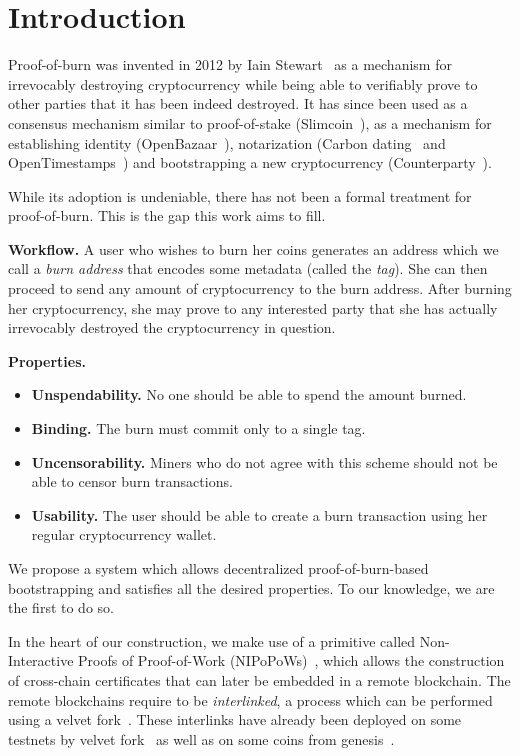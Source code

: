\section{Introduction}\label{section:introduction}
Proof-of-burn was invented in 2012 by Iain Stewart~\cite{stewart} as a mechanism for irrevocably destroying cryptocurrency while being able to verifiably prove to other parties that it has been indeed destroyed. It has since been used as a consensus mechanism similar to proof-of-stake (Slimcoin~\cite{slimcoin}), as a mechanism for establishing identity (OpenBazaar~\cite{zindros2016trust}), notarization (Carbon dating~\cite{clark2012commitcoin} and OpenTimestamps~\cite{todd2016opentimestamps}) and bootstrapping a new cryptocurrency (Counterparty~\cite{counterparty}).

While its adoption is undeniable, there has not been a formal treatment for proof-of-burn. This is the gap this work aims to fill.

\noindent
\textbf{Workflow.}
A user who wishes to burn her coins generates an address which we call a \emph{burn address} that encodes some metadata (called the \emph{tag}). She can then proceed to send any amount of cryptocurrency to the burn address. After burning her cryptocurrency, she may prove to any interested party that she has actually irrevocably destroyed the cryptocurrency in question.

\noindent
\textbf{Properties.}
\begin{itemize}
    \item \textbf{Unspendability.} No one should be able to spend the amount burned.
    \item \textbf{Binding.} The burn must commit only to a single tag.
    \item \textbf{Uncensorability.} Miners who do not agree with this scheme should not be able to censor burn transactions.
    \item \textbf{Usability.} The user should be able to create a burn transaction using her regular cryptocurrency wallet.
\end{itemize}

We propose a system which allows decentralized proof-of-burn-based bootstrapping and satisfies all the desired properties. To our knowledge, we are the first to do so.

In the heart of our construction, we make use of a primitive called
Non-Interactive Proofs of Proof-of-Work (NIPoPoWs)~\cite{nipopows}, which allows the
construction of cross-chain certificates that can later be embedded in a remote
blockchain. The remote blockchains require to be \emph{interlinked}, a process
which can be performed using a velvet fork~\cite{velvet}. These interlinks have
already been deployed on some testnets by velvet fork~\cite{gtklocker} as well
as on some coins from genesis~\cite{ergo}.

